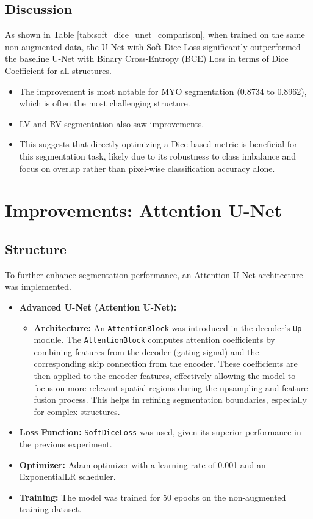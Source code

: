 \documentclass{article}
\begin{document}
\subsection{Discussion}
As shown in Table \ref{tab:soft_dice_unet_comparison}, when trained on the same non-augmented data, the U-Net with Soft Dice Loss significantly outperformed the baseline U-Net with Binary Cross-Entropy (BCE) Loss in terms of Dice Coefficient for all structures.
\begin{itemize}
  \item The improvement is most notable for MYO segmentation (0.8734 to 0.8962), which is often the most challenging structure.
  \item LV and RV segmentation also saw improvements.
  \item This suggests that directly optimizing a Dice-based metric is beneficial for this segmentation task, likely due to its robustness to class imbalance and focus on overlap rather than pixel-wise classification accuracy alone.
\end{itemize}


\section{Improvements: Attention U-Net}

\subsection{Structure}
To further enhance segmentation performance, an Attention U-Net architecture was implemented.
\begin{itemize}
  \item \textbf{Advanced U-Net (Attention U-Net):}
        \begin{itemize}
          \item \textbf{Architecture:} An \texttt{AttentionBlock} was introduced in the decoder's \texttt{Up} module. The \texttt{AttentionBlock} computes attention coefficients by combining features from the decoder (gating signal) and the corresponding skip connection from the encoder. These coefficients are then applied to the encoder features, effectively allowing the model to focus on more relevant spatial regions during the upsampling and feature fusion process. This helps in refining segmentation boundaries, especially for complex structures.
        \end{itemize}
  \item \textbf{Loss Function:} \texttt{SoftDiceLoss} was used, given its superior performance in the previous experiment.
  \item \textbf{Optimizer:} Adam optimizer with a learning rate of 0.001 and an ExponentialLR scheduler.
  \item \textbf{Training:} The model was trained for 50 epochs on the non-augmented training dataset.
\end{itemize}
\end{document}
